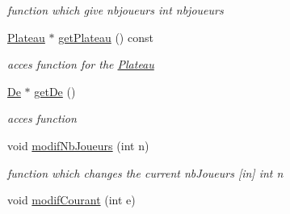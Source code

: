 \begin{DoxyCompactItemize}
\begin{DoxyCompactList}\small\item\em function which give nbjoueurs  int nbjoueurs \item\end{DoxyCompactList}\item 
\hyperlink{class_plateau}{Plateau} $\ast$ \hyperlink{class_moteur_jeu_a3bbef363f379f03269de384b8d0af4c2}{getPlateau} () const 
\begin{DoxyCompactList}\small\item\em acces function for the \hyperlink{class_plateau}{Plateau} \item\end{DoxyCompactList}\item 
\hyperlink{class_de}{De} $\ast$ \hyperlink{class_moteur_jeu_ab6f1f07047e2da443f02d1e3a4fb3bd3}{getDe} ()
\begin{DoxyCompactList}\small\item\em acces function \item\end{DoxyCompactList}\item 
\hypertarget{class_moteur_jeu_a73fece04f5bf1e5d794013df0b18a15a}{
void \hyperlink{class_moteur_jeu_a73fece04f5bf1e5d794013df0b18a15a}{modifNbJoueurs} (int n)}
\label{class_moteur_jeu_a73fece04f5bf1e5d794013df0b18a15a}

\begin{DoxyCompactList}\small\item\em function which changes the current nbJoueurs \mbox{[}in\mbox{]} int n \item\end{DoxyCompactList}\item 
\hypertarget{class_moteur_jeu_a265bd617bc6430520de3635c561216d1}{
void \hyperlink{class_moteur_jeu_a265bd617bc6430520de3635c561216d1}{modifCourant} (int e)}
\label{class_moteur_jeu_a265bd617bc6430520de3635c561216d1}


\end{DoxyCompactItemize}
